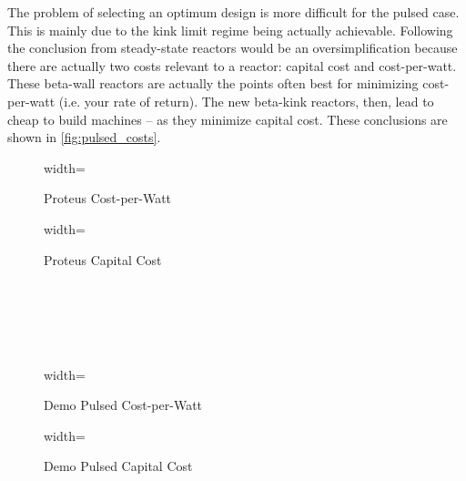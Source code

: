 The problem of selecting an optimum design is more difficult for the pulsed case. This is mainly due to the kink limit regime being actually achievable. Following the conclusion from steady-state reactors would be an oversimplification because there are actually two costs relevant to a reactor: capital cost and cost-per-watt. These beta-wall reactors are actually the points often best for minimizing cost-per-watt (i.e. your rate of return). The new beta-kink reactors, then, lead to cheap to build machines -- as they minimize capital cost. These conclusions are shown in \cref{fig:pulsed_costs}.

\begin{figure*}
    \centering
    \hfill 
    \begin{subfigure}[t]{0.45\textwidth}
        \centering
		\begin{adjustbox}{width=\textwidth}
			\Large
			
		\end{adjustbox}
        \caption{Proteus Cost-per-Watt}
    \end{subfigure}
    \hfill
    \begin{subfigure}[t]{0.45\textwidth}
        \centering
		\begin{adjustbox}{width=\textwidth}
			\Large
			
		\end{adjustbox}
        \caption{Proteus Capital Cost}
    \end{subfigure}
    \hfill \hfill ~\\ ~\\ ~\\ ~\\
    \hfill 
    \begin{subfigure}[t]{0.45\textwidth}
        \centering
		\begin{adjustbox}{width=\textwidth}
			\Large
			
		\end{adjustbox}
        \caption{Demo Pulsed Cost-per-Watt}
    \end{subfigure}
    \hfill
    \begin{subfigure}[t]{0.45\textwidth}
        \centering
		\begin{adjustbox}{width=\textwidth}
			\Large
			
		\end{adjustbox}
        \caption{Demo Pulsed Capital Cost}
    \end{subfigure}	
    \hfill \hfill ~\\ ~\\ ~\\
    \caption{Pulsed Cost Curves}
    \label{fig:pulsed_costs}
\end{figure*}

